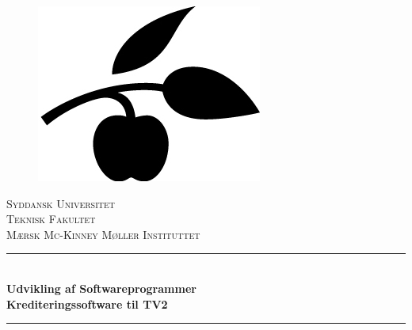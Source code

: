 \begin{titlepage}
    \vspace{1cm}
    \begin{center}
        \begin{figure}[h!]
            \centering
            \includegraphics[scale=1]{images/SDUlogo.jpg}
            
            \label{fig:SDUlogo}
        \end{figure}
        
        \textsc{\LARGE Syddansk Universitet}\\[0.3cm]
        \textsc{\Large Teknisk Fakultet}\\[0.3cm]
        \textsc{\large Mærsk Mc-Kinney Møller Instituttet}\\[1.25cm]
        
        \rule{\linewidth}{0.2mm}\\[0.35cm] %
        { 
            \LARGE \bfseries Udvikling af Softwareprogrammer\\[0.35cm]
            \Large \bfseries Krediteringssoftware til TV2\\[0.35cm]
        }
        \rule{\linewidth}{0.2mm}\\[1cm]
        

\end{center}
\end{titlepage}
